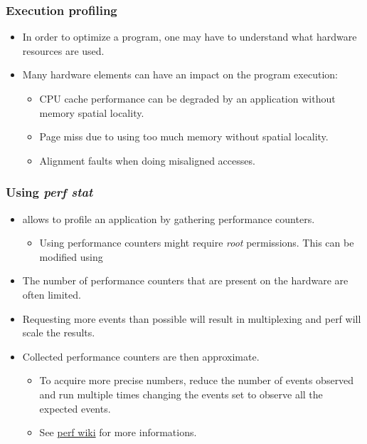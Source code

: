 \begin{frame}
  \frametitle{Execution profiling}
  \begin{itemize}
    \item In order to optimize a program, one may have to understand what
          hardware resources are used.
    \item Many hardware elements can have an impact on the program execution:
    \begin{itemize}
      \item CPU cache performance can be degraded by an application without
        memory spatial locality.
      \item Page miss due to using too much memory without spatial locality.
      \item Alignment faults when doing misaligned accesses.
    \end{itemize}
  \end{itemize}
\end{frame}

\begin{frame}[fragile]
  \frametitle{Using {\em perf stat}}
  \begin{itemize}
    \item {} allows to profile an application by gathering
          performance counters.
    \begin{itemize}
      \item Using performance counters might require {\em root} permissions. This can be
            modified using 
    \end{itemize}
    \item The number of performance counters that are present on the hardware are often
          limited.
    \item Requesting more events than possible will result in multiplexing and
          perf will scale the results.
    \item Collected performance counters are then approximate.
    \begin{itemize}
      \item To acquire more precise numbers, reduce the number of events
            observed and run  multiple times changing the events set
            to observe all the expected events.
      \item See \href{https://perf.wiki.kernel.org/index.php/Tutorial#multiple_events}{perf wiki}
            for more informations.
    \end{itemize}
  \end{itemize}
\end{frame}

